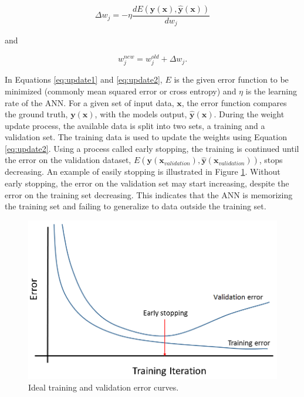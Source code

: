 \documentclass[tocnosub,noragright,centerchapter,12pt,fullpage]{uiucecethesis09}
\begin{document}
\begin{equation} \label{eq:update1}
\Delta w_{j} = - \eta \frac{dE(\boldsymbol{y}(\boldsymbol{x}),\hat{\boldsymbol{y}}(\boldsymbol{x}))}{dw_j}
\end{equation}

and 

\begin{equation} \label{eq:update2}
w^{new}_{j} = w^{old}_{j} + \Delta w_{j}.
\end{equation}

In Equations \ref{eq:update1} and \ref{eq:update2}, $E$ is the given error function to be minimized (commonly mean squared error or cross entropy) and $\eta$ is the learning rate of the ANN. For a given set of input data, $\boldsymbol{x}$, the error function compares the ground truth, $\boldsymbol{y}(\boldsymbol{x})$, with the models output, $\hat{\boldsymbol{y}}(\boldsymbol{x})$. During the weight update process, the available data is split into two sets, a training and a validation set. The training data is used to update the weights using Equation \ref{eq:update2}. Using a process called early stopping, the training is continued until the error on the validation dataset, $E(\boldsymbol{y}(\boldsymbol{x}_{validation}),\hat{\boldsymbol{y}}(\boldsymbol{x}_{validation}))$, stops decreasing. An example of easily stopping is illustrated in Figure \ref{fig:training_validation_error}. Without early stopping, the error on the validation set may start increasing, despite the error on the training set decreasing. This indicates that the ANN is memorizing the training set and failing to generalize to data outside the training set.


\begin{figure}[H]
    \centering
    \includegraphics[width=0.6\linewidth]{images/training_validation_error}
    \caption{Ideal training and validation error curves.}
    \label{fig:training_validation_error}
\end{figure}
\end{document}
